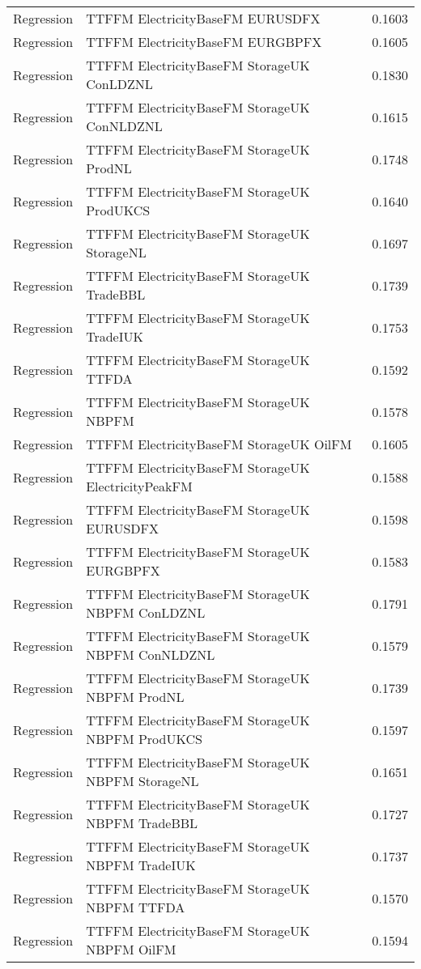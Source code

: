 \begin{table}[h!]
\begin{adjustbox}{max width=\textwidth}
\begin{tabular}{llr}
  Regression & TTFFM ElectricityBaseFM EURUSDFX & 0.1603 \\ 
  Regression & TTFFM ElectricityBaseFM EURGBPFX & 0.1605 \\ 
  Regression & TTFFM ElectricityBaseFM StorageUK ConLDZNL & 0.1830 \\ 
  Regression & TTFFM ElectricityBaseFM StorageUK ConNLDZNL & 0.1615 \\ 
  Regression & TTFFM ElectricityBaseFM StorageUK ProdNL & 0.1748 \\ 
  Regression & TTFFM ElectricityBaseFM StorageUK ProdUKCS & 0.1640 \\ 
  Regression & TTFFM ElectricityBaseFM StorageUK StorageNL & 0.1697 \\ 
  Regression & TTFFM ElectricityBaseFM StorageUK TradeBBL & 0.1739 \\ 
  Regression & TTFFM ElectricityBaseFM StorageUK TradeIUK & 0.1753 \\ 
  Regression & TTFFM ElectricityBaseFM StorageUK TTFDA & 0.1592 \\ 
  Regression & TTFFM ElectricityBaseFM StorageUK NBPFM & 0.1578 \\ 
  Regression & TTFFM ElectricityBaseFM StorageUK OilFM & 0.1605 \\ 
  Regression & TTFFM ElectricityBaseFM StorageUK ElectricityPeakFM & 0.1588 \\ 
  Regression & TTFFM ElectricityBaseFM StorageUK EURUSDFX & 0.1598 \\ 
  Regression & TTFFM ElectricityBaseFM StorageUK EURGBPFX & 0.1583 \\ 
  Regression & TTFFM ElectricityBaseFM StorageUK NBPFM ConLDZNL & 0.1791 \\ 
  Regression & TTFFM ElectricityBaseFM StorageUK NBPFM ConNLDZNL & 0.1579 \\ 
  Regression & TTFFM ElectricityBaseFM StorageUK NBPFM ProdNL & 0.1739 \\ 
  Regression & TTFFM ElectricityBaseFM StorageUK NBPFM ProdUKCS & 0.1597 \\ 
  Regression & TTFFM ElectricityBaseFM StorageUK NBPFM StorageNL & 0.1651 \\ 
  Regression & TTFFM ElectricityBaseFM StorageUK NBPFM TradeBBL & 0.1727 \\ 
  Regression & TTFFM ElectricityBaseFM StorageUK NBPFM TradeIUK & 0.1737 \\ 
  Regression & TTFFM ElectricityBaseFM StorageUK NBPFM TTFDA & 0.1570 \\ 
  Regression & TTFFM ElectricityBaseFM StorageUK NBPFM OilFM & 0.1594 \\ 

\end{tabular}
\end{adjustbox}
\end{table}
